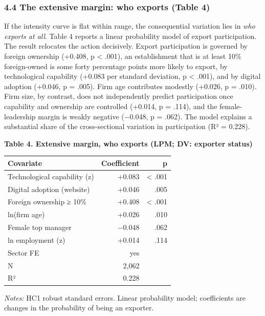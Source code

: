 \documentclass[
  12pt,a4paper]{article}
\begin{document}
\hypertarget{the-extensive-margin-who-exports-table-4}{%
\subsubsection{4.4 The extensive margin: who exports (Table
4)}\label{the-extensive-margin-who-exports-table-4}}

If the intensity curve is flat within range, the consequential variation
lies in \emph{who exports at all}. Table 4 reports a linear probability
model of export participation. The result relocates the action
decisively. Export participation is governed by foreign ownership
(+0.408, p \textless{} .001), an establishment that is at least 10\%
foreign-owned is some forty percentage points more likely to export, by
technological capability (+0.083 per standard deviation, p \textless{}
.001), and by digital adoption (+0.046, p = .005). Firm age contributes
modestly (+0.026, p = .010). Firm size, by contrast, does not
independently predict participation once capability and ownership are
controlled (+0.014, p = .114), and the female-leadership margin is
weakly negative (−0.048, p = .062). The model explains a substantial
share of the cross-sectional variation in participation (R² = 0.228).

\textbf{Table 4. Extensive margin, who exports (LPM; DV: exporter
status)}

\begin{longtable}[]{@{}lrr@{}}
\toprule\noalign{}
Covariate & Coefficient & p \\
\midrule\noalign{}
\endhead
\bottomrule\noalign{}
\endlastfoot
Technological capability (z) & +0.083 & \textless{} .001 \\
Digital adoption (website) & +0.046 & .005 \\
Foreign ownership ≥ 10\% & +0.408 & \textless{} .001 \\
ln(firm age) & +0.026 & .010 \\
Female top manager & −0.048 & .062 \\
ln employment (z) & +0.014 & .114 \\
Sector FE & yes & \\
N & 2,062 & \\
R² & 0.228 & \\
\end{longtable}

\emph{Notes:} HC1 robust standard errors. Linear probability model;
coefficients are changes in the probability of being an exporter.
\end{document}
